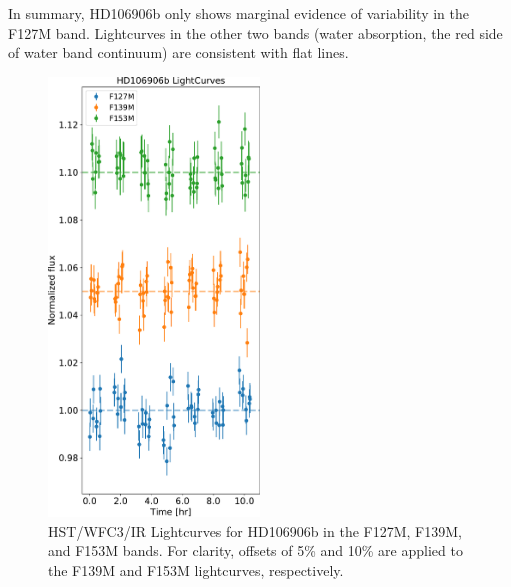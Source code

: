\documentclass[twocolumn]{aastex62}
\begin{document}
In summary, HD106906b only shows marginal  evidence of variability in the F127M band. Lightcurves in the other two bands (water absorption, the red side of water band continuum) are consistent with flat lines.

\begin{figure}[!ht]
  \centering
  \includegraphics[width=0.5\textwidth]{figures/HD106906_lightcurves.pdf}
  \caption[HST/WFC3/IR Lightcurves for HD106906b in the F127M, F139M, and F153M bands.]{HST/WFC3/IR Lightcurves for HD106906b in the F127M, F139M, and F153M bands. For clarity,  offsets of 5\% and 10\% are applied to the F139M and F153M lightcurves, respectively.}
  \label{fig:lightcurve}
\end{figure}
\end{document}
